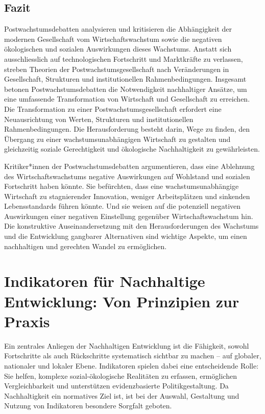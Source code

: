 \documentclass[
  nswissgerman,
  a4paper,
  openany]{book}
\begin{document}
\subsection{Fazit}\label{fazit-4}

Postwachstumsdebatten analysieren und kritisieren die Abhängigkeit der
modernen Gesellschaft vom Wirtschaftswachstum sowie die negativen
ökologischen und sozialen Auswirkungen dieses Wachstums. Anstatt sich
ausschliesslich auf technologischen Fortschritt und Marktkräfte zu
verlassen, streben Theorien der Postwachstumsgesellschaft nach
Veränderungen in Gesellschaft, Strukturen und institutionellen
Rahmenbedingungen. Insgesamt betonen Postwachstumsdebatten die
Notwendigkeit nachhaltiger Ansätze, um eine umfassende Transformation
von Wirtschaft und Gesellschaft zu erreichen. Die Transformation zu
einer Postwachstumsgesellschaft erfordert eine Neuausrichtung von
Werten, Strukturen und institutionellen Rahmenbedingungen. Die
Herausforderung besteht darin, Wege zu finden, den Übergang zu einer
wachstumsunabhängigen Wirtschaft zu gestalten und gleichzeitig soziale
Gerechtigkeit und ökologische Nachhaltigkeit zu gewährleisten.

Kritiker*innen der Postwachstumsdebatten argumentieren, dass eine
Ablehnung des Wirtschaftswachstums negative Auswirkungen auf Wohlstand
und sozialen Fortschritt haben könnte. Sie befürchten, dass eine
wachstumsunabhängige Wirtschaft zu stagnierender Innovation, weniger
Arbeitsplätzen und sinkenden Lebensstandards führen könnte. Und sie
weisen auf die potenziell negativen Auswirkungen einer negativen
Einstellung gegenüber Wirtschaftswachstum hin. Die konstruktive
Auseinandersetzung mit den Herausforderungen des Wachstums und die
Entwicklung gangbarer Alternativen sind wichtige Aspekte, um einen
nachhaltigen und gerechten Wandel zu ermöglichen.

\section{Indikatoren für Nachhaltige Entwicklung: Von Prinzipien zur
Praxis}\label{indikatoren-fuxfcr-nachhaltige-entwicklung-von-prinzipien-zur-praxis}

Ein zentrales Anliegen der Nachhaltigen Entwicklung ist die Fähigkeit,
sowohl Fortschritte als auch Rückschritte systematisch sichtbar zu
machen -- auf globaler, nationaler und lokaler Ebene. Indikatoren
spielen dabei eine entscheidende Rolle: Sie helfen, komplexe
sozial-ökologische Realitäten zu erfassen, ermöglichen Vergleichbarkeit
und unterstützen evidenzbasierte Politikgestaltung. Da Nachhaltigkeit
ein normatives Ziel ist, ist bei der Auswahl, Gestaltung und Nutzung von
Indikatoren besondere Sorgfalt geboten.
\end{document}
